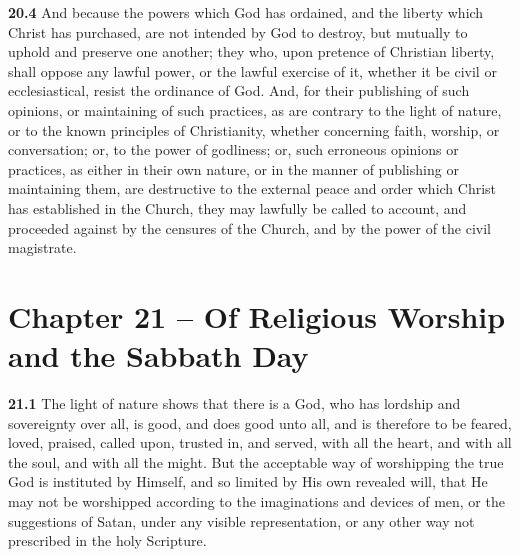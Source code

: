 \par\textbf{20.4} And because the powers which God has ordained, and the liberty which Christ has purchased, are not intended by God to destroy, but mutually to uphold and preserve one another; they who, upon pretence of Christian liberty, shall oppose any lawful power, or the lawful exercise of it, whether it be civil or ecclesiastical, resist the ordinance of God. And, for their publishing of such opinions, or maintaining of such practices, as are contrary to the light of nature, or to the known principles of Christianity, whether concerning faith, worship, or conversation; or, to the power of godliness; or, such erroneous opinions or practices, as either in their own nature, or in the manner of publishing or maintaining them, are destructive to the external peace and order which Christ has established in the Church, they may lawfully be called to account, and proceeded against by the censures of the Church, and by the power of the civil magistrate.

\section{Chapter 21 -- Of Religious Worship and the Sabbath Day}

\par\textbf{21.1} The light of nature shows that there is a God, who has lordship and sovereignty over all, is good, and does good unto all, and is therefore to be feared, loved, praised, called upon, trusted in, and served, with all the heart, and with all the soul, and with all the might. But the acceptable way of worshipping the true God is instituted by Himself, and so limited by His own revealed will, that He may not be worshipped according to the imaginations and devices of men, or the suggestions of Satan, under any visible representation, or any other way not prescribed in the holy Scripture.   

